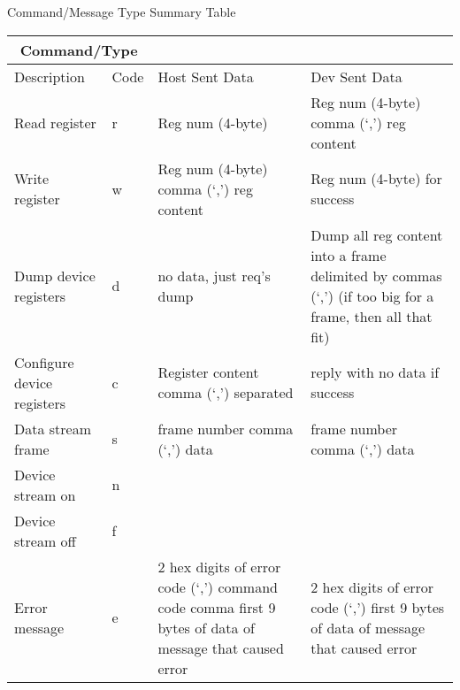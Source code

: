 \documentclass{customdocclass}
\begin{document}
\begin{center}
\small
Command/Message Type Summary Table
\begin{tabularx}{\textwidth}{|X|l|X|X|} \hline
\multicolumn{2}{|c|}{Command/Type} & & \\ \hline
Description & Code & Host Sent Data & Dev Sent Data \\ \hline
Read register & r & Reg num (4-byte) & Reg num (4-byte) comma (`,') reg content \\ \hline
Write register & w & Reg num (4-byte) comma (`,') reg content & Reg num (4-byte) for success \\ \hline
Dump device registers & d & no data, just req's dump & Dump all reg content into a frame delimited by commas (`,') (if too big for a frame, then all that fit) \\ \hline
Configure device registers & c & Register content comma (`,') separated & reply with no data if success \\ \hline
Data stream frame & s & frame number comma (`,') data &  frame number comma (`,') data \\ \hline
Device stream on & n & & \\ \hline
Device stream off & f & & \\ \hline
Error message & e & 2 hex digits of error code (`,') command code comma first 9 bytes of data of message that caused error &  2 hex digits of error code (`,') first 9 bytes of data of message that caused error \\ \hline
\end{tabularx}
\end{center}
\end{document}
